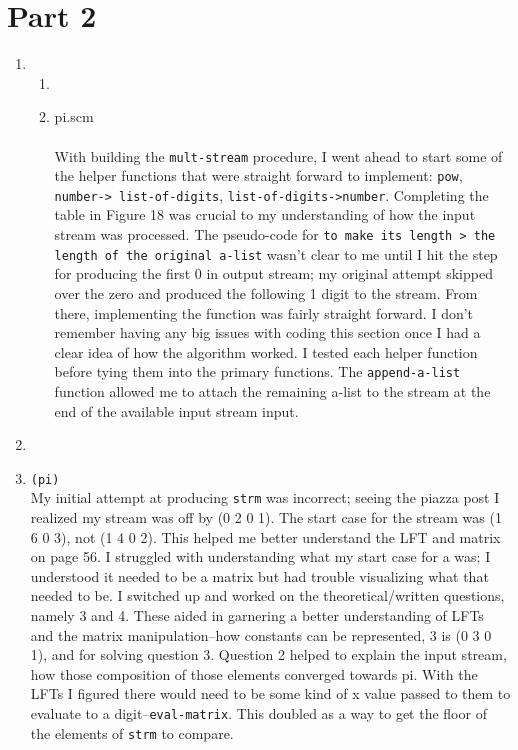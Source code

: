 \documentclass[a4paper,12pt]{article}
\begin{document}
\section{Part 2}
\begin{enumerate}
\item 
\begin{enumerate} 
\item 
\item pi.scm\\
\\
With building the \texttt{mult-stream} procedure, I went ahead to start some of the helper functions that were straight forward to implement: \texttt{pow}, \texttt{number-> list-of-digits}, \texttt{list-of-digits->number}. Completing the table in Figure 18 was crucial to my understanding of how the input stream was processed. The pseudo-code for \texttt{to make its length > the length of the original a-list} wasn't clear to me until I hit the step for producing the first 0 in output stream; my original attempt skipped over the zero and produced the following 1 digit to the stream. From there, implementing the function was fairly straight forward. I don't remember having any big issues with coding this section once I had a clear idea of how the algorithm worked. I tested each helper function before tying them into the primary functions. The \texttt{append-a-list} function allowed me to attach the remaining a-list to the stream at the end of the available input stream input.
\end{enumerate}
\item 
\item \texttt{(pi)}\\
My initial attempt at producing \texttt{strm} was incorrect; seeing the piazza post I realized my stream was off by (0 2 0 1). The start case for the stream was (1 6 0 3), not (1 4 0 2). This helped me better understand the LFT and matrix on page 56. I struggled with understanding what my start case for a was; I understood it needed to be a matrix but had trouble visualizing what that needed to be. I switched up and worked on the theoretical/written questions, namely 3 and 4. These aided in garnering a better understanding of LFTs and the matrix manipulation--how constants can be represented, 3 is (0 3 0 1), and for solving question 3. Question 2 helped to explain the input stream, how those composition of those elements converged towards pi. With the LFTs I figured there would need to be some kind of x value passed to them to evaluate to a digit--\texttt{eval-matrix}. This doubled as a way to get the floor of the elements of \texttt{strm} to compare.\\

\end{enumerate}
\end{document}
